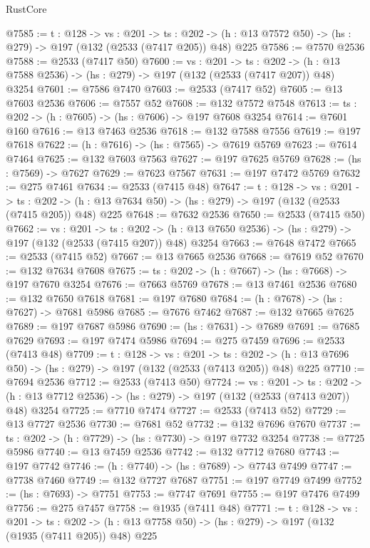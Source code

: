 \begin{lexlean}{RustCore}
\begin{coremodule}
@7585 := {t : @128} ->
  {vs : @201} ->
  {ts : @202} -> (h : @13 @7572 @50) -> (hs : @279) -> @197 (@132 (@2533 (@7417 @205)) @48) @225
@7586 := @7570 @2536
@7588 := @2533 (@7417 @50)
@7600 := {vs : @201} ->
  {ts : @202} -> (h : @13 @7588 @2536) -> (hs : @279) -> @197 (@132 (@2533 (@7417 @207)) @48) @3254
@7601 := @7586 @7470
@7603 := @2533 (@7417 @52)
@7605 := @13 @7603 @2536
@7606 := @7557 @52
@7608 := @132 @7572 @7548
@7613 := {ts : @202} -> (h : @7605) -> (hs : @7606) -> @197 @7608 @3254
@7614 := @7601 @160
@7616 := @13 @7463 @2536
@7618 := @132 @7588 @7556
@7619 := @197 @7618
@7622 := (h : @7616) -> (hs : @7565) -> @7619 @5769
@7623 := @7614 @7464
@7625 := @132 @7603 @7563
@7627 := @197 @7625 @5769
@7628 := (hs : @7569) -> @7627
@7629 := @7623 @7567
@7631 := @197 @7472 @5769
@7632 := @275 @7461
@7634 := @2533 (@7415 @48)
@7647 := {t : @128} ->
  {vs : @201} ->
  {ts : @202} -> (h : @13 @7634 @50) -> (hs : @279) -> @197 (@132 (@2533 (@7415 @205)) @48) @225
@7648 := @7632 @2536
@7650 := @2533 (@7415 @50)
@7662 := {vs : @201} ->
  {ts : @202} -> (h : @13 @7650 @2536) -> (hs : @279) -> @197 (@132 (@2533 (@7415 @207)) @48) @3254
@7663 := @7648 @7472
@7665 := @2533 (@7415 @52)
@7667 := @13 @7665 @2536
@7668 := @7619 @52
@7670 := @132 @7634 @7608
@7675 := {ts : @202} -> (h : @7667) -> (hs : @7668) -> @197 @7670 @3254
@7676 := @7663 @5769
@7678 := @13 @7461 @2536
@7680 := @132 @7650 @7618
@7681 := @197 @7680
@7684 := (h : @7678) -> (hs : @7627) -> @7681 @5986
@7685 := @7676 @7462
@7687 := @132 @7665 @7625
@7689 := @197 @7687 @5986
@7690 := (hs : @7631) -> @7689
@7691 := @7685 @7629
@7693 := @197 @7474 @5986
@7694 := @275 @7459
@7696 := @2533 (@7413 @48)
@7709 := {t : @128} ->
  {vs : @201} ->
  {ts : @202} -> (h : @13 @7696 @50) -> (hs : @279) -> @197 (@132 (@2533 (@7413 @205)) @48) @225
@7710 := @7694 @2536
@7712 := @2533 (@7413 @50)
@7724 := {vs : @201} ->
  {ts : @202} -> (h : @13 @7712 @2536) -> (hs : @279) -> @197 (@132 (@2533 (@7413 @207)) @48) @3254
@7725 := @7710 @7474
@7727 := @2533 (@7413 @52)
@7729 := @13 @7727 @2536
@7730 := @7681 @52
@7732 := @132 @7696 @7670
@7737 := {ts : @202} -> (h : @7729) -> (hs : @7730) -> @197 @7732 @3254
@7738 := @7725 @5986
@7740 := @13 @7459 @2536
@7742 := @132 @7712 @7680
@7743 := @197 @7742
@7746 := (h : @7740) -> (hs : @7689) -> @7743 @7499
@7747 := @7738 @7460
@7749 := @132 @7727 @7687
@7751 := @197 @7749 @7499
@7752 := (hs : @7693) -> @7751
@7753 := @7747 @7691
@7755 := @197 @7476 @7499
@7756 := @275 @7457
@7758 := @1935 (@7411 @48)
@7771 := {t : @128} ->
  {vs : @201} ->
  {ts : @202} -> (h : @13 @7758 @50) -> (hs : @279) -> @197 (@132 (@1935 (@7411 @205)) @48) @225

\end{coremodule}
\end{lexlean}
